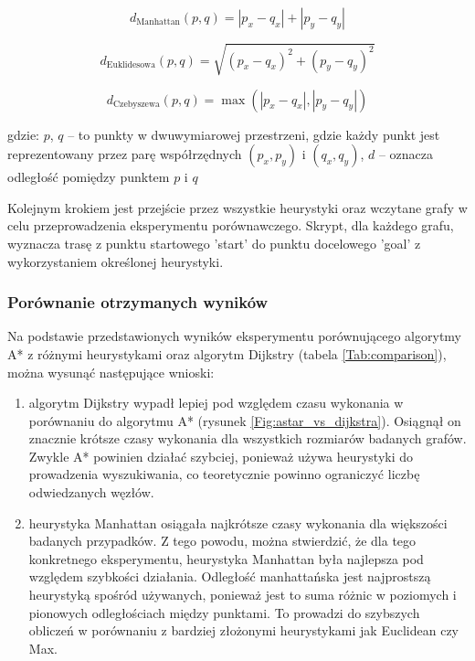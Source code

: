 \documentclass[12pt,twoside]{article}
\begin{document}
\begin{equation}
d_{\text{Manhattan}}(p, q) = |p_x - q_x| + |p_y - q_y|
\label{Eq:manhattan}
\end{equation}

\begin{equation}
d_{\text{Euklidesowa}}(p, q) = \sqrt{(p_x - q_x)^2 + (p_y - q_y)^2}
\label{Eq:euclidean}
\end{equation}

\begin{equation}
d_{\text{Czebyszewa}}(p, q) = \max(|p_x - q_x|, |p_y - q_y|)
\label{Eq:czebyszewa}
\end{equation}

gdzie: $p$, $q$ -- to punkty w dwuwymiarowej przestrzeni, gdzie każdy punkt jest reprezentowany przez parę współrzędnych $(p_x, p_y)$ i $(q_x, q_y)$, $d$ -- oznacza odległość pomiędzy punktem $p$ i $q$ \\

\newpage

Kolejnym krokiem jest przejście przez wszystkie heurystyki oraz wczytane grafy w celu przeprowadzenia eksperymentu porównawczego. Skrypt, dla każdego grafu, wyznacza trasę z punktu startowego 'start' do punktu docelowego 'goal' z wykorzystaniem określonej heurystyki.

\subsubsection{Porównanie otrzymanych wyników}

Na podstawie przedstawionych wyników eksperymentu porównującego algorytmy A* z różnymi heurystykami oraz algorytm Dijkstry (tabela \ref{Tab:comparison}), można wysunąć następujące wnioski:

\begin{enumerate}[label=\alph*), leftmargin=1.25cm]
	\item algorytm Dijkstry wypadł lepiej pod względem czasu wykonania w porównaniu do algorytmu A* (rysunek \ref{Fig:astar_vs_dijkstra}). Osiągnął on znacznie krótsze czasy wykonania dla wszystkich rozmiarów badanych grafów. Zwykle A* powinien działać szybciej, ponieważ używa heurystyki do prowadzenia wyszukiwania, co teoretycznie powinno ograniczyć liczbę odwiedzanych węzłów.
	\item heurystyka Manhattan osiągała najkrótsze czasy wykonania dla większości badanych przypadków. Z tego powodu, można stwierdzić, że dla tego konkretnego eksperymentu, heurystyka Manhattan była najlepsza pod względem szybkości działania. Odległość manhattańska jest najprostszą heurystyką spośród używanych, ponieważ jest to suma różnic w poziomych i pionowych odległościach między punktami. To prowadzi do szybszych obliczeń w porównaniu z bardziej złożonymi heurystykami jak Euclidean czy Max.
\end{enumerate}
\end{document}

